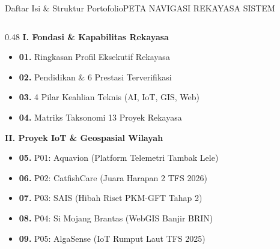 \documentclass[aspectratio=169,11pt]{beamer}
\begin{document}
\begin{frame}{Daftar Isi \& Struktur Portofolio}{PETA NAVIGASI REKAYASA SISTEM}
  \begin{columns}[t]
    \begin{column}{0.48\textwidth}
      {\small \bfseries \color{brandNavy} I. Fondasi \& Kapabilitas Rekayasa} \vspace{2pt}
      \begin{itemize}[leftmargin=12pt,itemsep=1.5pt,topsep=1pt]
        \scriptsize
        \item \textbf{01.} Ringkasan Profil Eksekutif Rekayasa
        \item \textbf{02.} Pendidikan \& 6 Prestasi Terverifikasi
        \item \textbf{03.} 4 Pilar Keahlian Teknis (AI, IoT, GIS, Web)
        \item \textbf{04.} Matriks Taksonomi 13 Proyek Rekayasa
      \end{itemize}
      \vspace{5pt}
      {\small \bfseries \color{brandNavy} II. Proyek IoT \& Geospasial Wilayah} \vspace{2pt}
      \begin{itemize}[leftmargin=12pt,itemsep=1.5pt,topsep=1pt]
        \scriptsize
        \item \textbf{05.} P01: Aquavion (Platform Telemetri Tambak Lele)
        \item \textbf{06.} P02: CatfishCare (Juara Harapan 2 TFS 2026)
        \item \textbf{07.} P03: SAIS (Hibah Riset PKM-GFT Tahap 2)
        \item \textbf{08.} P04: Si Mojang Brantas (WebGIS Banjir BRIN)
        \item \textbf{09.} P05: AlgaSense (IoT Rumput Laut TFS 2025)
      \end{itemize}
    \end{column}


\end{columns}
\end{frame}
\end{document}
